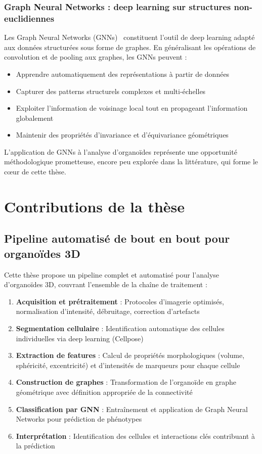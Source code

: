 \subsubsection{Graph Neural Networks : deep learning sur structures non-euclidiennes}

Les Graph Neural Networks (GNNs)~\cite{Wu2021,Zhou2020,Battaglia2018} constituent l'outil de deep learning adapté aux données structurées sous forme de graphes. En généralisant les opérations de convolution et de pooling aux graphes, les GNNs peuvent :
\begin{itemize}
    \item Apprendre automatiquement des représentations à partir de données
    \item Capturer des patterns structurels complexes et multi-échelles
    \item Exploiter l'information de voisinage local tout en propageant l'information globalement
    \item Maintenir des propriétés d'invariance et d'équivariance géométriques
\end{itemize}

L'application de GNNs à l'analyse d'organoïdes représente une opportunité méthodologique prometteuse, encore peu explorée dans la littérature, qui forme le cœur de cette thèse.

\section{Contributions de la thèse}

\subsection{Pipeline automatisé de bout en bout pour organoïdes 3D}

Cette thèse propose un pipeline complet et automatisé pour l'analyse d'organoïdes 3D, couvrant l'ensemble de la chaîne de traitement :

\begin{enumerate}
    \item \textbf{Acquisition et prétraitement} : Protocoles d'imagerie optimisés, normalisation d'intensité, débruitage, correction d'artefacts
    \item \textbf{Segmentation cellulaire} : Identification automatique des cellules individuelles via deep learning (Cellpose)
    \item \textbf{Extraction de features} : Calcul de propriétés morphologiques (volume, sphéricité, excentricité) et d'intensités de marqueurs pour chaque cellule
    \item \textbf{Construction de graphes} : Transformation de l'organoïde en graphe géométrique avec définition appropriée de la connectivité
    \item \textbf{Classification par GNN} : Entraînement et application de Graph Neural Networks pour prédiction de phénotypes
    \item \textbf{Interprétation} : Identification des cellules et interactions clés contribuant à la prédiction
\end{enumerate}

